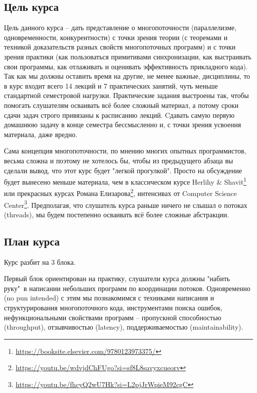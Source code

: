 \documentclass[a4paper, 12pt]{extarticle}
\begin{document}
\subsection*{Цель курса}

Цель данного курса -- дать представление о многопоточности (параллелизме, одновременности, конкурентности) с точки зрения теории (с теоремами и техникой доказательств разных свойств многопоточных программ) и с точки зрения практики (как пользоваться примитивами синхронизации, как выстраивать свои программы, как отлаживать и оценивать эффективность прикладного кода). Так как мы должны оставить время на другие, не менее важные, дисциплины, то в курс входит всего 14 лекций и 7 практических занятий, чуть меньше стандартной семестровой нагрузки. Практические задания выстроены так, чтобы помогать слушателям осваивать всё более сложный материал, а потому сроки сдачи задач строго привязаны к расписанию лекций. Cдавать самую первую домашнюю задачу в конце семестра бессмысленно и, с точки зрения усвоения материала, даже вредно.

Сама концепция многопоточности, по мнению многих опытных программистов, весьма сложна и поэтому не хотелось бы, чтобы из предыдущего абзаца вы сделали вывод, что этот курс будет "легкой прогулкой". Просто на обсуждение будет вынесено меньше материала, чем в классическом курсе  Herlihy \& Shavit\footnote{\url{https://booksite.elsevier.com/9780123973375/}}
или прекрасных курсах Романа Елизарова\footnote{\url{https://youtu.be/wdvjdChFUgo?si=sf8L8savyxcueorv}}, интенсивах от Computer Science Center\footnote{\url{https://youtu.be/fhcyQ2wU7Hk?si=L2pjJrWpieM92cgC}}. Предполагая, что слушатель курса раньше ничего не слышал о потоках (threads), мы будем постепенно осваивать всё более сложные абстракции. 

\subsection*{План курса}

Курс разбит на 3 блока. 

Первый блок ориентирован на практику, слушатели курса должны "набить руку"\ в написании небольших программ по координации потоков. Одновременно (no pun intended) с этим мы познакомимся с техниками написания и структурирования многопоточного кода, инструментами поиска ошибок, нефункциональными свойствами программ -- пропускной способностью (throughput), отзывчивостью (latency), поддерживаемостью (maintainability).
\end{document}
